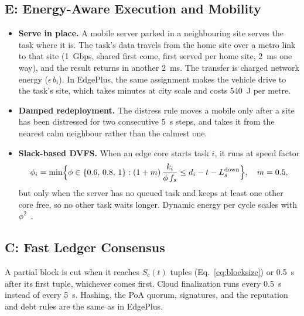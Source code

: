 \documentclass[11pt,journal,onecolumn]{IEEEtran}
\begin{document}
\subsection{E: Energy-Aware Execution and Mobility}
\label{sec:pec-e}
\begin{itemize}
\item \textbf{Serve in place.} A mobile server parked in a neighbouring site serves the task where it is. The task's data travels from the home site over a metro link to that site (1~Gbps, shared first come, first served per home site, 2~ms one way), and the result returns in another 2~ms. The transfer is charged network energy ($\epsilon\, b_i$). In EdgePlus, the same assignment makes the vehicle drive to the task's site, which takes minutes at city scale and costs 540~J per metre.
\item \textbf{Damped redeployment.} The distress rule moves a mobile only after a site has been distressed for two consecutive 5~s steps, and takes it from the nearest calm neighbour rather than the calmest one.
\item \textbf{Slack-based DVFS.} When an edge core starts task $i$, it runs at speed factor
\begin{equation}
\phi_i = \min\Bigl\{\phi \in \{0.6,\, 0.8,\, 1\} : (1 + m)\,\frac{k_i}{\phi\, f_s} \le d_i - t - L^{\mathrm{down}}_s \Bigr\}, \quad m = 0.5,
\label{eq:dvfs}
\end{equation}
but only when the server has no queued task and keeps at least one other core free, so no other task waits longer. Dynamic energy per cycle scales with $\phi^2$~\cite{yao,pillai}.
\end{itemize}

\subsection{C: Fast Ledger Consensus}
\label{sec:pec-c}
A partial block is cut when it reaches $S_c(t)$ tuples (Eq.~\eqref{eq:blocksize}) or 0.5~s after its first tuple, whichever comes first. Cloud finalization runs every 0.5~s instead of every 5~s. Hashing, the PoA quorum, signatures, and the reputation and debt rules are the same as in EdgePlus.
\end{document}
